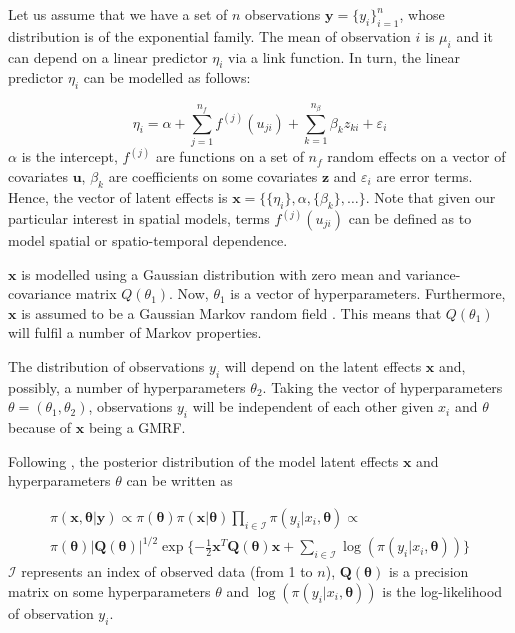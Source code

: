 \documentclass[article]{jss}
\begin{document}
Let us assume that we have a set of $n$ observations 
$\mathbf{y}=\{y_i\}_ {i=1}^n$, whose distribution is of the exponential family.
The mean of observation $i$ is $\mu_i$ and it can depend on a linear predictor 
$\eta_i$ via a link function. In turn, the linear
predictor $\eta_i$ can be modelled as follows:

\begin{equation}
\eta_i=\alpha+\sum_{j=1}^{n_f} f^{(j)}(u_{ji})+\sum_{k=1}^{n_{\beta}}\beta_k z_{ki}+\varepsilon_i
\end{equation}
\noindent
$\alpha$ is the intercept, $f^{(j)}$ are functions on a set of $n_f$ random
effects on a vector of covariates $\mathbf{u}$, $\beta_k$ are coefficients on
some covariates $\mathbf{z}$ and $\varepsilon_i$ are error terms. Hence, the
vector of latent effects is $\mathbf{x}=\{\{\eta_i\}, \alpha, \{\beta_k\},
\ldots\}$. Note that given our particular interest in spatial models, terms
$f^{(j)}(u_{ji})$ can be defined as to model spatial or spatio-temporal
dependence.

$\mathbf{x}$ is modelled using a Gaussian distribution with zero mean and
variance-covariance matrix $Q(\theta_1)$. Now, $\theta_1$ is a vector of
hyperparameters. Furthermore, $\mathbf{x}$ is assumed to be a Gaussian Markov
random field \citep[GMRF,][]{rueheld:2005}. This means that  $Q(\theta_1)$ will fulfil a number of
Markov properties. 

The distribution of observations $y_i$ will depend on the latent effects
$\mathbf{x}$ and, possibly, a number of hyperparameters $\theta_2$.  Taking
the vector of hyperparameters $\theta=(\theta_1, \theta_2)$, observations
$y_i$ will be independent of each other given $x_i$ and $\theta$ because
of $\mathbf{x}$ being a GMRF.

Following \citet{isi:000264374200002}, the posterior distribution of the model
latent effects $\mathbf{x}$ and hyperparameters $\theta$ can be written as 

\begin{eqnarray}
\pi(\mathbf{x}, \mathbf{\theta}|\mathbf{y}) \propto
\pi(\mathbf{\theta}) \pi(\mathbf{x}|\mathbf{\theta})\prod_{i\in \mathcal{I}}\pi(y_i|x_i,\mathbf{\theta})
\propto  \\ \nonumber
\pi(\mathbf{\theta}) |\mathbf{Q}(\mathbf{\theta})|^{1/2} \exp\{-\frac{1}{2}\mathbf{x}^T \mathbf{Q}(\mathbf{\theta}) \mathbf{x}+\sum_{i\in\mathcal{I}} \log(\pi(y_i|x_i, \mathbf{\theta})) \}
\end{eqnarray}
\noindent
$\mathcal{I}$ represents an index of observed data (from 1 to $n$),
$\mathbf{Q}(\mathbf{\theta})$ is a precision matrix on some
hyperparameters $\theta$ and $\log(\pi(y_i|x_i, \mathbf{\theta}))$ is
the log-likelihood of observation $y_i$.
\end{document}
